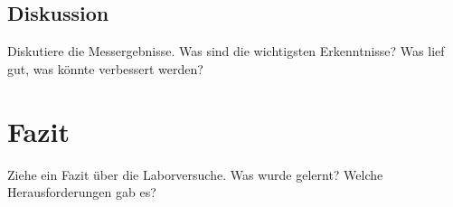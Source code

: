 \documentclass[a4paper,12pt]{article}
\begin{document}
\subsection{Diskussion}
Diskutiere die Messergebnisse. Was sind die wichtigsten Erkenntnisse? Was lief gut, was könnte verbessert werden?

\section{Fazit}
Ziehe ein Fazit über die Laborversuche. Was wurde gelernt? Welche Herausforderungen gab es?
\end{document}
